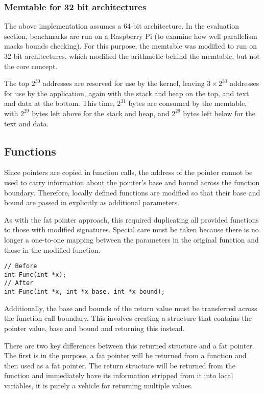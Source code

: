\subsubsection{Memtable for 32 bit architectures}

The above implementation assumes a 64-bit architecture.
In the evaluation section, benchmarks are run on a Raspberry Pi (to examine how well parallelism masks bounds checking).
For this purpose, the memtable was modified to run on 32-bit architectures, which modified the arithmetic behind the memtable, but not the core concept.

The top $2^{30}$ addresses are reserved for use by the kernel, leaving $3 \times 2^{30}$ addresses for use by the application, again with the stack and heap on the top, and text and data at the bottom.
This time, $2^{31}$ bytes are consumed by the memtable, with $2^{29}$ bytes left above for the stack and heap, and $2^{29}$ bytes left below for the text and data.
\subsection{Functions}

Since pointers are copied in function calls, the address of the pointer cannot be used to carry information about the pointer's base and bound across the function boundary.
Therefore, locally defined functions are modified so that their base and bound are passed in explicitly as additional parameters.

As with the fat pointer approach, this required duplicating all provided functions to those with modified signatures.
Special care must be taken because there is no longer a one-to-one mapping between the parameters in the original function and those in the modified function.

\begin{verbatim}
// Before
int Func(int *x);
// After
int Func(int *x, int *x_base, int *x_bound);
\end{verbatim}

Additionally, the base and bounds of the return value must be transferred across the function call boundary.
This involves creating a structure that contains the pointer value, base and bound and returning this instead.

There are two key differences between this returned structure and a fat pointer.
The first is in the purpose, a fat pointer will be returned from a function and then used as a fat pointer.
The return structure will be returned from the function and immediately have its information stripped from it into local variables, it is purely a vehicle for returning multiple values.

